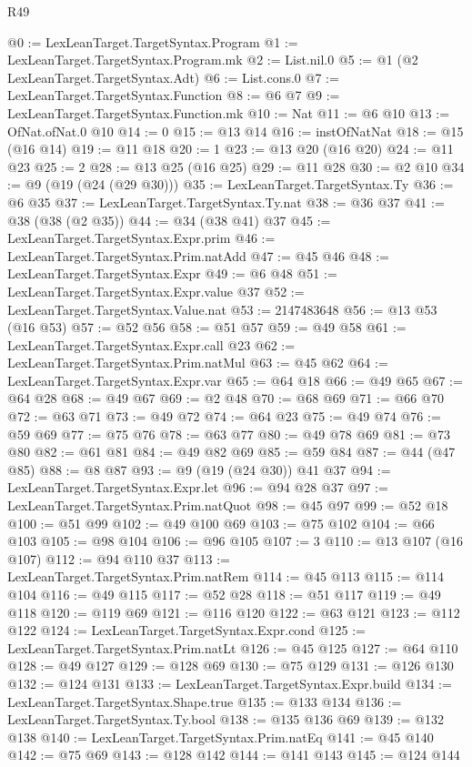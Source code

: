 \begin{lexlean}{R49}
\begin{coremodule}
@0 := LexLeanTarget.TargetSyntax.Program
@1 := LexLeanTarget.TargetSyntax.Program.mk
@2 := List.nil.{0}
@5 := @1 (@2 LexLeanTarget.TargetSyntax.Adt)
@6 := List.cons.{0}
@7 := LexLeanTarget.TargetSyntax.Function
@8 := @6 @7
@9 := LexLeanTarget.TargetSyntax.Function.mk
@10 := Nat
@11 := @6 @10
@13 := OfNat.ofNat.{0} @10
@14 := 0
@15 := @13 @14
@16 := instOfNatNat
@18 := @15 (@16 @14)
@19 := @11 @18
@20 := 1
@23 := @13 @20 (@16 @20)
@24 := @11 @23
@25 := 2
@28 := @13 @25 (@16 @25)
@29 := @11 @28
@30 := @2 @10
@34 := @9 (@19 (@24 (@29 @30)))
@35 := LexLeanTarget.TargetSyntax.Ty
@36 := @6 @35
@37 := LexLeanTarget.TargetSyntax.Ty.nat
@38 := @36 @37
@41 := @38 (@38 (@2 @35))
@44 := @34 (@38 @41) @37
@45 := LexLeanTarget.TargetSyntax.Expr.prim
@46 := LexLeanTarget.TargetSyntax.Prim.natAdd
@47 := @45 @46
@48 := LexLeanTarget.TargetSyntax.Expr
@49 := @6 @48
@51 := LexLeanTarget.TargetSyntax.Expr.value @37
@52 := LexLeanTarget.TargetSyntax.Value.nat
@53 := 2147483648
@56 := @13 @53 (@16 @53)
@57 := @52 @56
@58 := @51 @57
@59 := @49 @58
@61 := LexLeanTarget.TargetSyntax.Expr.call @23
@62 := LexLeanTarget.TargetSyntax.Prim.natMul
@63 := @45 @62
@64 := LexLeanTarget.TargetSyntax.Expr.var
@65 := @64 @18
@66 := @49 @65
@67 := @64 @28
@68 := @49 @67
@69 := @2 @48
@70 := @68 @69
@71 := @66 @70
@72 := @63 @71
@73 := @49 @72
@74 := @64 @23
@75 := @49 @74
@76 := @59 @69
@77 := @75 @76
@78 := @63 @77
@80 := @49 @78 @69
@81 := @73 @80
@82 := @61 @81
@84 := @49 @82 @69
@85 := @59 @84
@87 := @44 (@47 @85)
@88 := @8 @87
@93 := @9 (@19 (@24 @30)) @41 @37
@94 := LexLeanTarget.TargetSyntax.Expr.let
@96 := @94 @28 @37
@97 := LexLeanTarget.TargetSyntax.Prim.natQuot
@98 := @45 @97
@99 := @52 @18
@100 := @51 @99
@102 := @49 @100 @69
@103 := @75 @102
@104 := @66 @103
@105 := @98 @104
@106 := @96 @105
@107 := 3
@110 := @13 @107 (@16 @107)
@112 := @94 @110 @37
@113 := LexLeanTarget.TargetSyntax.Prim.natRem
@114 := @45 @113
@115 := @114 @104
@116 := @49 @115
@117 := @52 @28
@118 := @51 @117
@119 := @49 @118
@120 := @119 @69
@121 := @116 @120
@122 := @63 @121
@123 := @112 @122
@124 := LexLeanTarget.TargetSyntax.Expr.cond
@125 := LexLeanTarget.TargetSyntax.Prim.natLt
@126 := @45 @125
@127 := @64 @110
@128 := @49 @127
@129 := @128 @69
@130 := @75 @129
@131 := @126 @130
@132 := @124 @131
@133 := LexLeanTarget.TargetSyntax.Expr.build
@134 := LexLeanTarget.TargetSyntax.Shape.true
@135 := @133 @134
@136 := LexLeanTarget.TargetSyntax.Ty.bool
@138 := @135 @136 @69
@139 := @132 @138
@140 := LexLeanTarget.TargetSyntax.Prim.natEq
@141 := @45 @140
@142 := @75 @69
@143 := @128 @142
@144 := @141 @143
@145 := @124 @144

\end{coremodule}
\end{lexlean}
